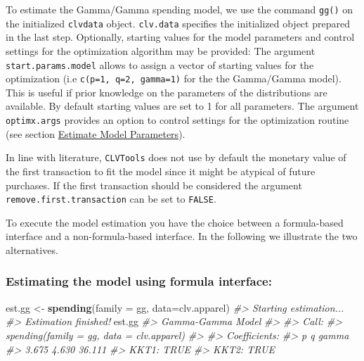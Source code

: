 \documentclass[
]{article}
\newenvironment{Shaded}{\begin{snugshade}}{\end{snugshade}}
\newcommand{\AttributeTok}[1]{\textcolor[rgb]{0.13,0.29,0.53}{#1}}
\newcommand{\CommentTok}[1]{\textcolor[rgb]{0.56,0.35,0.01}{\textit{#1}}}
\newcommand{\FunctionTok}[1]{\textcolor[rgb]{0.13,0.29,0.53}{\textbf{#1}}}
\newcommand{\NormalTok}[1]{#1}
\newcommand{\OtherTok}[1]{\textcolor[rgb]{0.56,0.35,0.01}{#1}}
\begin{document}
To estimate the Gamma/Gamma spending model, we use the command
\texttt{gg()} on the initialized \texttt{clvdata} object.
\texttt{clv.data} specifies the initialized object prepared in the last
step. Optionally, starting values for the model parameters and control
settings for the optimization algorithm may be provided: The argument
\texttt{start.params.model} allows to assign a vector of starting values
for the optimization (i.e \texttt{c(p=1,\ q=2,\ gamma=1)} for the the
Gamma/Gamma model). This is useful if prior knowledge on the parameters
of the distributions are available. By default starting values are set
to 1 for all parameters. The argument \texttt{optimx.args} provides an
option to control settings for the optimization routine (see section
\hyperref[estimate]{Estimate Model Parameters}).

In line with literature, \texttt{CLVTools} does not use by default the
monetary value of the first transaction to fit the model since it might
be atypical of future purchases. If the first transaction should be
considered the argument \texttt{remove.first.transaction} can be set to
\texttt{FALSE}.

To execute the model estimation you have the choice between a
formula-based interface and a non-formula-based interface. In the
following we illustrate the two alternatives.

\subsubsection{\texorpdfstring{\textbf{Estimating the model using
formula
interface:}}{Estimating the model using formula interface:}}\label{estimating-the-model-using-formula-interface-6}

\begin{Shaded}
\begin{Highlighting}[]
\NormalTok{est.gg }\OtherTok{\textless{}{-}} \FunctionTok{spending}\NormalTok{(}\AttributeTok{family =}\NormalTok{ gg, }\AttributeTok{data=}\NormalTok{clv.apparel)}
\CommentTok{\#\textgreater{} Starting estimation...}
\CommentTok{\#\textgreater{} Estimation finished!}
\NormalTok{est.gg}
\CommentTok{\#\textgreater{} Gamma{-}Gamma Model}
\CommentTok{\#\textgreater{} }
\CommentTok{\#\textgreater{} Call:}
\CommentTok{\#\textgreater{} spending(family = gg, data = clv.apparel)}
\CommentTok{\#\textgreater{} }
\CommentTok{\#\textgreater{} Coefficients:}
\CommentTok{\#\textgreater{}      p       q   gamma  }
\CommentTok{\#\textgreater{}  3.675   4.630  36.111  }
\CommentTok{\#\textgreater{} KKT1: TRUE }
\CommentTok{\#\textgreater{} KKT2: TRUE}
\end{Highlighting}
\end{Shaded}
\end{document}
